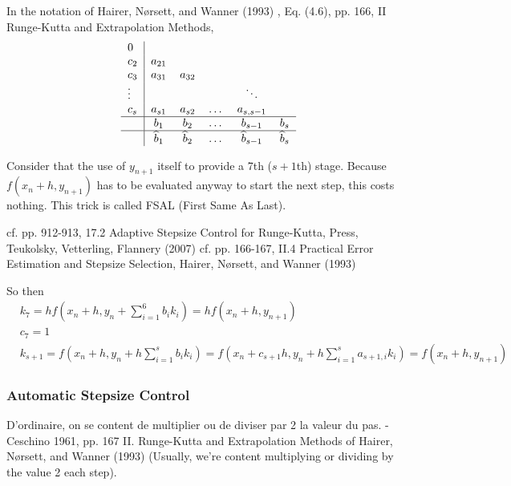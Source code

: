 \documentclass[10pt]{amsart}
\begin{document}
\begin{multicols*}{2}
In the notation of Hairer, N\o rsett, and Wanner (1993) \cite{HNW1993}, Eq. (4.6), pp. 166, II Runge-Kutta and Extrapolation Methods,
\begin{equation}
	\begin{tabular}{ l|c c c c c }
		0 & & & & & \\
		$c_2$ & $a_{21}$ &  & & & \\ 
		$c_3$ & $a_{31}$ & $a_{32}$ & & & \\ 
		$\vdots$ &  & & & $\ddots$ & \\ 
		$c_s$ & $a_{s1}$ & $a_{s2}$ & \dots & $a_{s, s-1}$ & \\
		\hline 
		& $b_1$ & $b_2$ & \dots & $b_{s-1}$ & $b_s$ \\	
		\hline
		& $\widehat{b}_1$ & $\widehat{b}_2$ & \dots & $\widehat{b}_{s-1}$ & $\widehat{b}_s$ \\
	\end{tabular}
\end{equation}


Consider that the use of $y_{n+1}$ itself to provide a 7th ($s+1$th) stage. Because $f(x_n+h , y_{n+1})$ has to be evaluated anyway to start the next step, this costs nothing. This trick is called FSAL (First Same As Last).

cf. pp. 912-913, 17.2 Adaptive Stepsize Control for Runge-Kutta, Press, Teukolsky, Vetterling, Flannery (2007) \cite{PTVF2007}
cf. pp. 166-167, II.4 Practical Error Estimation and Stepsize Selection, Hairer, N\o rsett, and Wanner (1993) \cite{HNW1993}

So then
\[
\begin{aligned}
	& k_7 = h f(x_n + h, y_n + \sum_{i=1}^6 b_i k_i) = hf(x_n + h,y_{n+1}) \\
	& c_7 = 1 \\
	& k_{s+1} = f(x_n +h , y_n + h\sum_{i=1}^s b_i k_i) = f(x_n + c_{s+1}h , y_n + h\sum_{i=1}^s a_{s+1,i} k_i) = f(x_n + h,y_{n+1})
\end{aligned}
\]

\subsubsection{Automatic Stepsize Control}

D'ordinaire, on se content de multiplier ou de diviser par 2 la valeur du pas. -Ceschino 1961, pp. 167 II. Runge-Kutta and Extrapolation Methods of Hairer, N\o rsett, and Wanner (1993) \cite{HNW1993} (Usually, we're content multiplying or dividing by the value 2 each step).


\end{multicols*}
\end{document}
